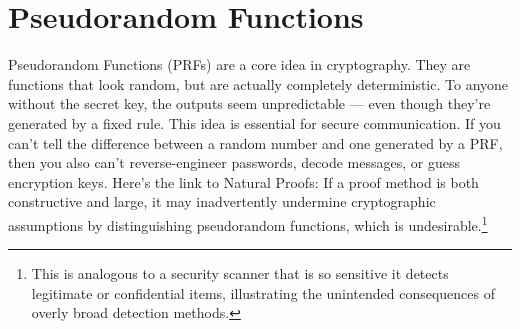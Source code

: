 \documentclass[12pt]{report}
\begin{document}
\section{Pseudorandom Functions}
Pseudorandom Functions (PRFs) are a core idea in cryptography.  
They are functions that look random, but are actually completely deterministic.  
To anyone without the secret key, the outputs seem unpredictable --- even though they're generated by a fixed rule.
This idea is essential for secure communication.  
If you can't tell the difference between a random number and one generated by a PRF, then you also can't reverse-engineer passwords, decode messages, or guess encryption keys.
Here's the link to Natural Proofs:  
If a proof method is both constructive and large, it may inadvertently undermine cryptographic assumptions by distinguishing pseudorandom functions, which is undesirable.\footnote{This is analogous to a security scanner that is so sensitive it detects legitimate or confidential items, illustrating the unintended consequences of overly broad detection methods.}
\end{document}
